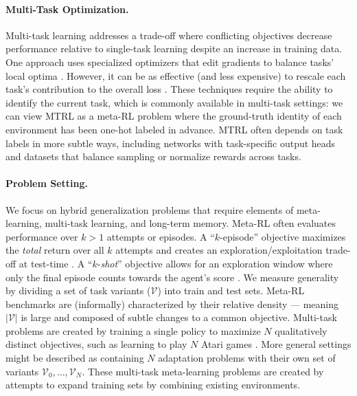 \documentclass{article}
\begin{document}
\paragraph{Multi-Task Optimization.} Multi-task learning addresses a trade-off where conflicting objectives decrease performance relative to single-task learning despite an increase in training data. One approach uses specialized optimizers that edit gradients to balance tasks' local optima \cite{shaham2023causes, du2018adapting, yu2020gradient, li2021robust, wang2020gradient, liu2021conflict}. However, it can be as effective (and less expensive) to rescale each task's contribution to the overall loss \cite{xin2022current, hessel2019multi, royer2024scalarization, kurin2022defense, sodhani2021multi}. These techniques require the ability to identify the current task, which is commonly available in multi-task settings: we can view MTRL as a meta-RL problem where the ground-truth identity of each environment has been one-hot labeled in advance. MTRL often depends on task labels in more subtle ways, including networks with task-specific output heads \cite{kumar2022offline} and datasets that balance sampling \cite{d2024sharing} or normalize rewards \cite{garage} across tasks.
\paragraph{Problem Setting.} We focus on hybrid generalization problems that require elements of meta-learning, multi-task learning, and long-term memory. Meta-RL often evaluates performance over $k > 1$ attempts or episodes. A ``$k$-episode'' objective maximizes the \textit{total} return over all $k$ attempts and creates an exploration/exploitation trade-off at test-time \cite{zintgraf2022fast}. A ``$k$-\textit{shot}'' objective allows for an exploration window where only the final episode counts towards the agent's score \cite{liu2021decoupling, stadie2018some}. We measure generality by dividing a set of task variants ($\mathcal{V}$) into train and test sets. Meta-RL benchmarks are (informally) characterized by their relative density --- meaning $|\mathcal{V}|$ is large and composed of subtle changes to a common objective. Multi-task problems are created by training a single policy to maximize $N$ qualitatively distinct objectives, such as learning to play $N$ Atari games  \cite{bellemare2013arcade}. More general settings might be described as containing $N$ adaptation problems with their own set of variants $\mathcal{V}_0, \dots, \mathcal{V}_N$. These multi-task meta-learning problems are created by attempts to expand training sets by combining existing environments.
\end{document}
